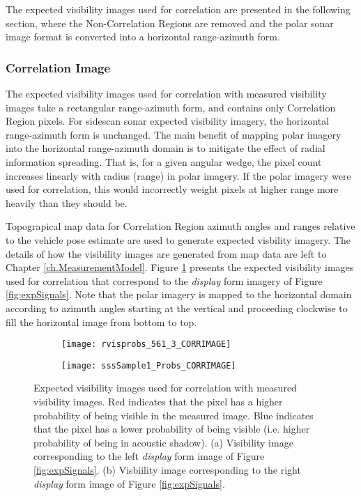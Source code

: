 The expected visibility images used for correlation are presented in the following section, where the Non-Correlation Regions are removed and the polar sonar image format is converted into a horizontal range-azimuth form.

\subsubsection{Correlation Image}
\label{framework.Measurement.Expected.CorrImage}

The expected visibility images used for correlation with measured visibility images take a rectangular range-azimuth form, and contains only Correlation Region pixels.
For sidescan sonar expected visibility imagery, the horizontal range-azimuth form is unchanged.
The main benefit of mapping polar imagery into the horizontal range-azimuth domain is to mitigate the effect of radial information spreading.
That is, for a given angular wedge, the pixel count increases linearly with radius (range) in polar imagery.
If the polar imagery were used for correlation, this would incorrectly weight pixels at higher range more heavily than they should be.

Topograpical map data for Correlation Region azimuth angles and ranges relative to the vehicle pose estimate are used to generate expected visbility imagery.
The details of how the visibility images are generated from map data are left to Chapter \ref{ch.MeasurementModel}.
Figure \ref{fig:expSignalsCORR} presents the expected visibility images used for correlation that correspond to the \emph{display} form imagery of Figure \ref{fig:expSignals}.
Note that the polar imagery is mapped to the horizontal domain according to azimuth angles starting at the vertical and proceeding clockwise to fill the horizontal image from bottom to top.

\begin{figure}[!h]
	\centering
	\begin{subfigure}[b]{0.54\textwidth}
                \texttt{[image: rvisprobs\_561\_3\_CORRIMAGE]}
                \caption{}
  	\end{subfigure}
 	\hspace{8ex}
  	\centering
	\begin{subfigure}[b]{0.314\textwidth}
                \texttt{[image: sssSample1\_Probs\_CORRIMAGE]}
                \caption{}
  	\end{subfigure}
	\caption{Expected visibility images used for correlation with measured visibility images. Red indicates that the pixel has a higher probability of being visible in the measured image. Blue indicates that the pixel has a lower probability of being visible (i.e. higher probability of being in acoustic shadow). (a) Visibility image corresponding to the left \emph{display} form image of Figure \ref{fig:expSignals}. (b) Visbiility image corresponding to the right \emph{display} form image of Figure \ref{fig:expSignals}. }	
	\label{fig:expSignalsCORR}
\end{figure}

